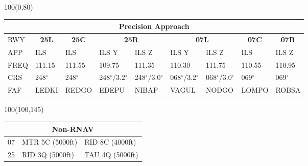 \documentclass[10pt,landscape,a4paper]{article}
\begin{document}
\begin{textblock}{100}(0,80)
\begin{table}[]
\begin{tabular}{|l|l|l|l|l|l|l|l|l|}
\multicolumn{9}{c}{\textbf{Precision Approach}}                                                                                                                                                                            \\ \hline
RWY  & \multicolumn{1}{c|}{\textbf{25L}} & \multicolumn{1}{c|}{\textbf{25C}} & \multicolumn{2}{c|}{\textbf{25R}} & \multicolumn{2}{c|}{\textbf{07L}} & \multicolumn{1}{c|}{\textbf{07C}} & \multicolumn{1}{c|}{\textbf{07R}} \\ \hline
APP  & ILS                               & ILS                               & ILS Y           & ILS Z           & ILS Y           & ILS Z           & ILS                               & ILS Z                             \\
FREQ & 111.15                            & 111.55                            & 109.75          & 111.35          & 110.30          & 111.75          & 110.55                            & 110.95                            \\
CRS  & 248$^\circ$                              & 248$^\circ$                              & 248$^\circ$/3.2$^\circ$       & 248$^\circ$/3.0$^\circ$       & 068$^\circ$/3.2$^\circ$       & 068$^\circ$/3.0$^\circ$       & 069$^\circ$                              & 069$^\circ$                              \\
FAF  & LEDKI                             & REDGO                             & EDEPU           & NIBAP           & VAGUL           & NODGO           & LOMPO                             & ROBSA                             \\ \hline
\end{tabular}
\end{table}
\end{textblock}



\begin{textblock}{100}(100,145)
\begin{table}[]
\begin{tabular}{|l|l|l|}
\multicolumn{3}{c}{\textbf{Non-RNAV}} \\ \hline
07  & MTR 5C (5000ft)    & RID 8C (4000ft)   \\ \hline
25  & RID 3Q (5000ft)    & TAU 4Q (5000ft)   \\ \hline
\end{tabular}
\end{table}
\end{textblock}
\end{document}
